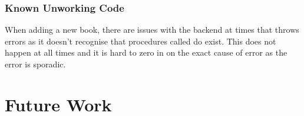\documentclass{article}
\begin{document}
\subsubsection*{Known Unworking Code}

When adding a new book, there are issues with the backend at times that throws errors as it doesn't 
recognise that procedures called do exist. This does not happen at all times and it is hard to zero 
in on the exact cause of error as the error is sporadic.

\section*{Future Work}
\end{document}
